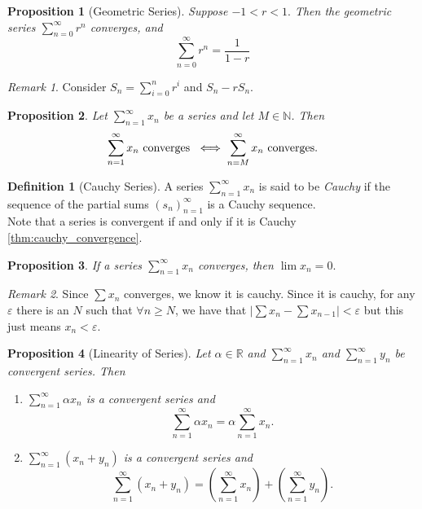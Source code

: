 \documentclass{article}
\newtheorem{proposition}{Proposition}[section]
\theoremstyle{definition}
\newtheorem{definition}{Definition}[section]
\theoremstyle{remark}
\newtheorem{remark}{Remark}[section]
\begin{document}
\begin{proposition}[Geometric Series]\label{prp:geo_series}
Suppose $ -1 < r < 1.$ Then the geometric series $ \sum_{n=0}^\infty{r^n}$ converges, and 
\[
\sum_{n=0}^\infty{r^n} = \frac{1}{1-r}
\]
\end{proposition}

\begin{remark}
    Consider $S_n = \sum^n_{i=0}{r^i}$ and $S_n - rS_n$.
\end{remark}




\begin{proposition}
Let $\sum_{n=1}^\infty{x_n}$ be a series and let $M \in \mathbb{N}$. Then
\[
\sum_{n=1}^\infty{x_n} \textnormal{ converges } \iff \sum_{n=M}^\infty{x_n} \textnormal{ converges.}
\]
\end{proposition}


\begin{definition}[Cauchy Series]\label{def:cauchy_series}
A series $\sum_{n=1}^\infty{x_n}$ is said to be \textit{Cauchy} if the sequence of the partial sums $ (s_n)^\infty_{n=1}$ is a Cauchy sequence.\\
Note that a series is convergent if and only if it is Cauchy \ref{thm:cauchy_convergence}.
\end{definition}




\begin{proposition}
If a series $\sum_{n=1}^\infty{x_n}$ converges, then $\lim{x_n} = 0.$
\end{proposition}

\begin{remark}
Since $\sum{x_n}$ converges, we know it is cauchy. Since it is cauchy, 
for any $\varepsilon$ there is an $N$ such that $\forall n \geq N$, we have that 
$|\sum{x_n} - \sum{x_{n-1}}| < \varepsilon$ but this just means $x_n < \varepsilon$.
\end{remark}




\begin{proposition}[Linearity of Series]\label{prp:linearity_series}
Let $\alpha \in \mathbb{R}$ and $\sum_{n=1}^{\infty} x_n$ and $\sum_{n=1}^{\infty} y_n$ be convergent series. Then
\begin{enumerate}
\item $\sum_{n=1}^{\infty} \alpha x_n$ is a convergent series and
\[
\sum_{n=1}^{\infty} \alpha x_n = \alpha \sum_{n=1}^{\infty} x_n.
\]
\item $\sum_{n=1}^{\infty} (x_n + y_n)$ is a convergent series and
\[
\sum_{n=1}^{\infty} (x_n + y_n) = \left( \sum_{n=1}^{\infty} x_n \right) + \left( \sum_{n=1}^{\infty} y_n \right).
\]
\end{enumerate}

\end{proposition}
\end{document}
